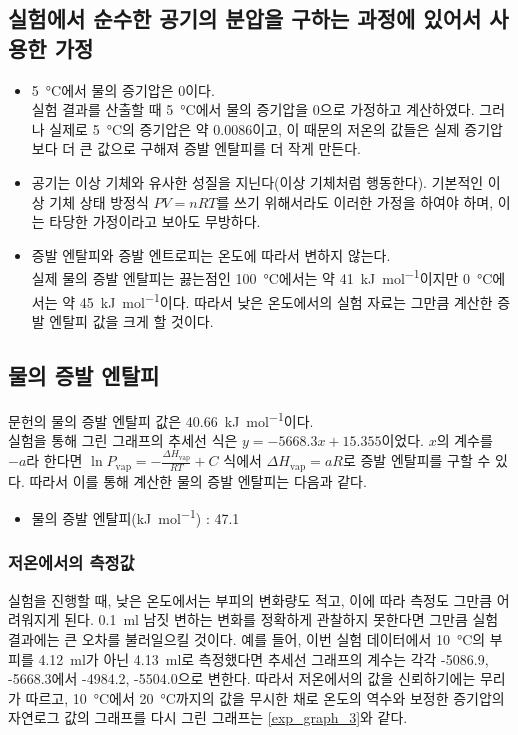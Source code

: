 \documentclass[a4paper,10pt]{article}
\begin{document}
	\subsection{실험에서 순수한 공기의 분압을 구하는 과정에 있어서 사용한 가정}
	\begin{itemize}
		\item \SI{5}{\degreeCelsius}에서 물의 증기압은 0이다. \\
		실험 결과를 산출할 때 \SI{5}{\degreeCelsius}에서 물의 증기압을 0으로 가정하고 계산하였다. 그러나 실제로 \SI{5}{\degreeCelsius}의 증기압은 약 \SI{0.0086}{\atmosphere}이고, 이 때문의 저온의 값들은 실제 증기압보다 더 큰 값으로 구해져 증발 엔탈피를 더 작게 만든다.
		\item 공기는 이상 기체와 유사한 성질을 지닌다(이상 기체처럼 행동한다).
		기본적인 이상 기체 상태 방정식 $PV=nRT$를 쓰기 위해서라도 이러한 가정을 하여야 하며, 이는 타당한 가정이라고 보아도 무방하다.
		\item 증발 엔탈피와 증발 엔트로피는 온도에 따라서 변하지 않는다. \\
		실제 물의 증발 엔탈피는 끓는점인 \SI{100}{\degreeCelsius}에서는 약 \SI{41}{\kilo\joule\per\mole}이지만 \SI{0}{\degreeCelsius}에서는 약 \SI{45}{\kilo\joule\per\mole}이다. \cite{vapor_1} 따라서 낮은 온도에서의 실험 자료는 그만큼 계산한 증발 엔탈피 값을 크게 할 것이다.
		
	\end{itemize}
	
	\subsection{물의 증발 엔탈피}
	문헌의 물의 증발 엔탈피 값은 \SI{40.66}{\kilo\joule\per\mole}이다. \cite{vapor_1} \\
	실험을 통해 그린 그래프의 추세선 식은 $y = -5668.3x + 15.355$이었다. $x$의 계수를 $-a$라 한다면 $\ln P_{\mathrm{vap}} = -\frac{\Delta H_{\mathrm{vap}}}{RT} + C$ 식에서 $\Delta H_{\mathrm{vap}} = aR$로 증발 엔탈피를 구할 수 있다. 따라서 이를 통해 계산한 물의 증발 엔탈피는 다음과 같다.
	\begin{itemize}
		\item 물의 증발 엔탈피(\si{\kilo\joule\per\mole}) : 47.1
	\end{itemize}
	
	\subsubsection{저온에서의 측정값}
	실험을 진행할 때, 낮은 온도에서는 부피의 변화량도 적고, 이에 따라 측정도 그만큼 어려워지게 된다. \SI{0.1}{\milli\litre} 남짓 변하는 변화를 정확하게 관찰하지 못한다면 그만큼 실험 결과에는 큰 오차를 불러일으킬 것이다. 예를 들어, 이번 실험 데이터에서 \SI{10}{\degreeCelsius}의 부피를 \SI{4.12}{\milli\litre}가 아닌 \SI{4.13}{\milli\litre}로 측정했다면 추세선 그래프의 계수는 각각 -5086.9, -5668.3에서 -4984.2, -5504.0으로 변한다. 따라서 저온에서의 값을 신뢰하기에는 무리가 따르고, \SI{10}{\degreeCelsius}에서 \SI{20}{\degreeCelsius}까지의 값을 무시한 채로 온도의 역수와 보정한 증기압의 자연로그 값의 그래프를 다시 그린 그래프는 \ref{exp_graph_3}와 같다.
	
\end{document}
